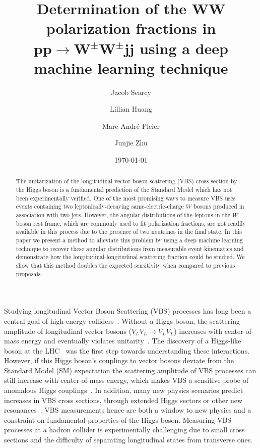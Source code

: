 \documentclass[aps,prl,twocolumn,showpacs,superscriptaddress,groupeaddress,floatfix]{revtex4}
\begin{document}
\title{Determination of the $\boldsymbol{WW}$ polarization fractions in $\boldsymbol{pp \rightarrow W^\pm W^\pm jj}$ using a deep machine learning technique}
\author{Jacob Searcy}
\author{Lillian Huang}
\author{Marc-Andr\'e Pleier}
\author{Junjie Zhu}

\date{\today}

\begin{abstract}
The unitarization of the longitudinal vector boson scattering (VBS) cross section by the Higgs boson is 
a fundamental prediction of the Standard Model which has not been experimentally verified. One of the most
promising ways to measure VBS uses events containing two leptonically-decaying same-electric-charge 
$W$ bosons produced in association with two jets. However, the angular distributions of the leptons in the $W$ boson rest frame, which are commonly used to fit polarization fractions, are not readily available in this process due to the presence of two neutrinos in the final state. 
In this paper we present a method to alleviate this problem by using a deep machine learning technique to recover these angular distributions from measurable event kinematics and demonstrate how the longitudinal-longitudinal scattering fraction could be studied. We show that this method doubles the expected sensitivity when compared to previous proposals.

\end{abstract}

\maketitle

Studying longitudinal Vector Boson Scattering (VBS) processes has
long been a central goal of high energy
colliders~\cite{SSC_1}. Without a Higgs boson, the scattering
amplitude of longitudinal vector bosons ($V_{L}V_{L} \rightarrow
V_{L}V_{L}$) increases with center-of-mass energy and eventually
violates unitarity~\cite{Uni_1,Uni_2,Uni_3}. The discovery of a
Higgs-like boson at the LHC~\cite{ATLAS_higgs,CMS_higgs} was the first
step towards understanding these interactions. However, if this Higgs
boson's couplings to vector bosons deviate from the Standard Model
(SM) expectation the scattering amplitude of VBS processes can still increase with center-of-mass
energy, which makes VBS a sensitive probe of anomalous Higgs
couplings~\cite{Higgs_con}. In addition, many new physics scenarios
predict increases in
VBS cross sections, through
extended Higgs sectors or other new resonances~\cite{Tmatrix,VLVLBSM,Trip_Higgs_old,Trip_higgs_new}. VBS measurements hence
are both a window to new physics and a constraint on fundamental properties
of the Higgs boson. Measuring VBS processes at a hadron collider is
experimentally challenging due to small cross sections and the
difficulty of separating longitudinal states from transverse ones.
\end{document}
